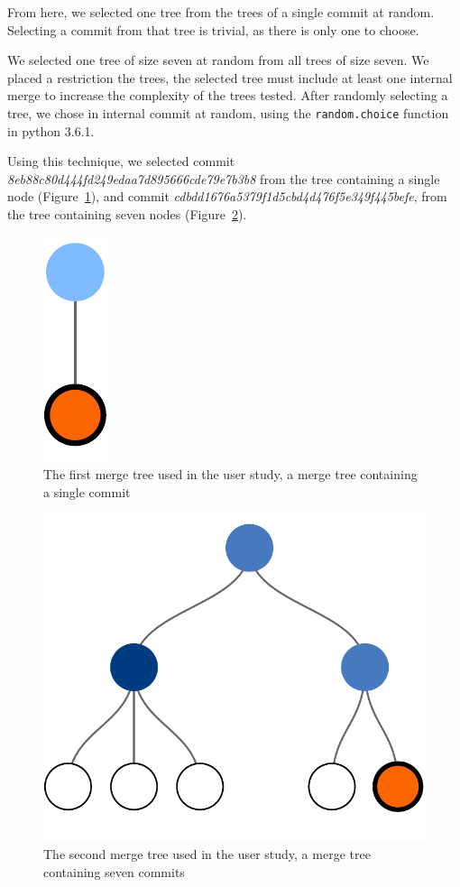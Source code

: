 From here, we selected one tree from the trees of a single commit at
random. Selecting a commit from that tree is trivial, as there is only
one to choose.

We selected one tree of size seven at random from all trees of size
seven. We placed a restriction the trees, the selected tree must include
at least one internal merge to increase the complexity of the trees
tested. After randomly selecting a tree, we chose in internal commit at
random, using the \verb|random.choice| function in python 3.6.1.



Using this technique, we selected commit
\emph{8eb88c80d444fd249edaa7d895666cde79e7b3b8} from the tree containing
a single node (Figure~\ref{fig:commit_1}), and commit
\emph{cdbdd1676a5379f1d5cbd4d476f5e349f445befe}, from the tree
containing seven nodes (Figure~\ref{fig:commit_2}).

\begin{figure}[bpt]
  \centering
  \includegraphics[width=0.08\linewidth]{figures/commits/1-commit.pdf}
  \caption{The first merge tree used in the user study, a merge tree
    containing a single commit}
  \label{fig:commit_1}
\end{figure}

\begin{figure}[bpt]
  \centering
  \includegraphics[width=0.5\linewidth]{figures/commits/7-commits.pdf}
  \caption{The second merge tree used in the user study, a merge tree
    containing seven commits}
  \label{fig:commit_2}
\end{figure}


